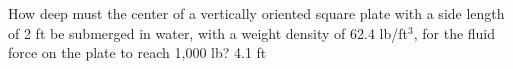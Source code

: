 {How deep must the center of a vertically oriented square plate with a side length of 2 ft be submerged in water, with a weight density of 62.4 lb/ft$^3$, for the fluid force on the plate to reach 1,000 lb?
}
{4.1 ft
}
